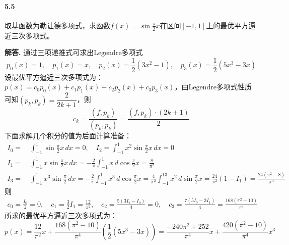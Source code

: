 \documentclass[12pt, a4paper, oneside]{ctexart}
\newenvironment{solution}{\par\noindent\textbf{解答. }}{\bigskip\par}
\begin{document}
\paragraph{5.5}取基函数为勒让德多项式，求函数$f(x)=\sin\frac{\pi}{2}x$在区间$[-1,1]$上的最优平方逼近三次多项式。
\begin{solution}
    通过三项递推式可求出$\text{Legendre}$多项式
    \begin{equation*}
        p_0(x) = 1,\quad p_1(x) = x,\quad p_2(x) = \frac{1}{2}(3x^2-1),\quad p_3(x) = \frac{1}{2}(5x^3-3x)
    \end{equation*}
    设最优平方逼近三次多项式为：$p(x) = c_0p_0(x)+c_1p_1(x)+c_2p_2(x)+c_3p_3(x)$，由$\text{Legendre}$多项式性质可知$(p_k,p_k)=\dfrac{2}{2k+1}$，则
    \begin{equation*}
        c_k=\frac{(f,p_k)}{(p_k,p_k)} = \frac{(f,p_k)\cdot(2k+1)}{2}
    \end{equation*}
    下面求解几个积分的值为后面计算准备：
    \begin{equation*}
        \begin{aligned}
            I_0 =&\ \int_{-1}^1\sin\frac{\pi}{2}x\,dx=0,\quad I_2 = \int_{-1}^1x^2\sin\frac{\pi}{2}x\,dx=0\\
            I_1 =&\ \int_{-1}^1x\sin\frac{\pi}{2}x\,dx=-\frac{2}{\pi}\int_{-1}^1x\,d\cos\frac{\pi}{2}x=\frac{8}{\pi^2}\\
            I_3 =&\ \int_{-1}^1x^3\sin\frac{\pi}{2}\,dx=-\frac{2}{\pi}\int_{-1}^1x^3\,d\cos\frac{\pi}{2}x=\frac{4}{\pi^2}\int_{-1}^13x^2\,d\sin\frac{\pi}{2}x = \frac{24}{\pi^2}(1-I_1)=\frac{24(\pi^2-8)}{\pi^4}
        \end{aligned}
    \end{equation*}
    则
    \begin{equation*}
        \begin{aligned}
            c_0=\frac{I_0}{2}=0,\quad c_1=\frac{3}{2}I_1=\frac{12}{\pi^2},\quad c_2=\frac{5(3I_2-I_0)}{4} = 0,\quad c_3=\frac{7(5I_3-3I_1)}{4}=\frac{168(\pi^2-10)}{\pi^4}
        \end{aligned}
    \end{equation*}
    所求的最优平方逼近三次多项式为：
    \begin{equation*}
        p(x) = \frac{12}{\pi^2}x+\frac{168(\pi^2-10)}{\pi^4}(\frac{1}{2}(5x^3-3x))=\frac{-240\pi^2+252}{\pi^4}x+\frac{420(\pi^2-10)}{\pi^4}x^3
    \end{equation*}
\end{solution}
\end{document}
